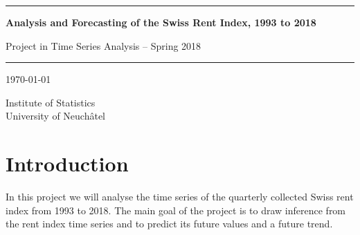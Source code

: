 \documentclass[11pt,a4paper]{article}
\begin{document}
\thispagestyle{empty}  %

\begin{center}

\vspace*{4cm}

\noindent\rule{15cm}{0.4pt}

\vspace*{2cm}

\Huge{\textbf{Analysis and Forecasting of the Swiss Rent Index, 1993 to 2018}}

\vspace{1cm}

\LARGE{Project in Time Series Analysis -- Spring 2018}

\vspace{2cm}

\noindent\rule{15cm}{0.4pt}

\vfill

\large{
    \today\\

}
\vspace{2cm}

\large{Institute of Statistics \\University of Neuchâtel}

\vspace{2cm}

\end{center}


\newpage



\thispagestyle{empty}
\tableofcontents

\newpage


\setcounter{page}{1}

\section{Introduction}

In this project we will analyse the time series of the quarterly collected Swiss rent index from 1993 to 2018.
The main goal of the project is to draw inference from the rent index time series and to predict its future values and a future trend.
\end{document}
